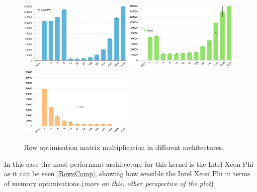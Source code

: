 \begin{figure}[!h]
    \centering
    \includegraphics[width=0.49\textwidth]{figures/opt2_phi.png}
    \includegraphics[width=0.49\textwidth]{figures/opt2_cpu.png}
    \includegraphics[width=0.49\textwidth]{figures/opt2_gpu.png}
    \caption{Row optimisation matrix multiplication in different architectures.}
    \label{Rows}
\end{figure}


\par{In this case the most performant architecture for this kernel is the Intel Xeon Phi as it can be seen \ref{RowsComp}, 
    showing how sensible the Intel Xeon Phi in terms of memory optimisations.(\emph{more on this, other perspective of the plot})}


